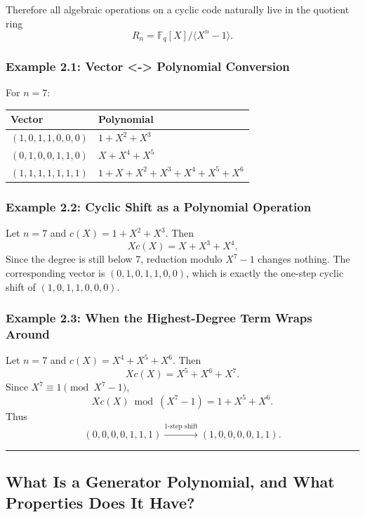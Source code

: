\documentclass[
]{article}
\begin{document}
Therefore all algebraic operations on a cyclic code naturally live in
the quotient ring \[R_n = \mathbb{F}_q[X]/\langle X^n-1 \rangle.\]

\subsubsection{Example 2.1: Vector \textless-\textgreater{} Polynomial
Conversion}\label{example-2.1-vector---polynomial-conversion}

For \(n=7\):

\begin{longtable}[]{@{}ll@{}}
\toprule\noalign{}
Vector & Polynomial \\
\midrule\noalign{}
\endhead
\bottomrule\noalign{}
\endlastfoot
\((1,0,1,1,0,0,0)\) & \(1+X^2+X^3\) \\
\((0,1,0,0,1,1,0)\) & \(X+X^4+X^5\) \\
\((1,1,1,1,1,1,1)\) & \(1+X+X^2+X^3+X^4+X^5+X^6\) \\
\end{longtable}

\subsubsection{Example 2.2: Cyclic Shift as a Polynomial
Operation}\label{example-2.2-cyclic-shift-as-a-polynomial-operation}

Let \(n=7\) and \(c(X)=1+X^2+X^3\). Then \[Xc(X)=X+X^3+X^4.\] Since the
degree is still below 7, reduction modulo \(X^7-1\) changes nothing. The
corresponding vector is \((0,1,0,1,1,0,0)\), which is exactly the
one-step cyclic shift of \((1,0,1,1,0,0,0)\).

\subsubsection{Example 2.3: When the Highest-Degree Term Wraps
Around}\label{example-2.3-when-the-highest-degree-term-wraps-around}

Let \(n=7\) and \(c(X)=X^4+X^5+X^6\). Then \[Xc(X)=X^5+X^6+X^7.\] Since
\(X^7 \equiv 1 \pmod{X^7-1}\), \[Xc(X) \bmod (X^7-1)=1+X^5+X^6.\] Thus
\[(0,0,0,0,1,1,1) \xrightarrow{\text{1-step shift}} (1,0,0,0,0,1,1).\]

\begin{center}\rule{0.5\linewidth}{0.5pt}\end{center}

\subsection{What Is a Generator Polynomial, and What Properties Does It
Have?}\label{what-is-a-generator-polynomial-and-what-properties-does-it-have}
\end{document}
